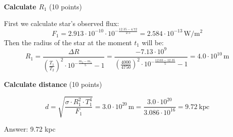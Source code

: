 \medskip
\noindent\textbf{Calculate $R_1$} \hfill(10 points)

First we calculate star's observed flux:
\[ F_1 = 2.913 \cdot 10^{-10} \cdot 10^{-\frac{12.35 - 4.72}{2.5}}
   = 2.584 \cdot 10^{-13}\,\mathrm{W/m^2} \]
Then the radius of the star at the moment $t_1$ will be:
\[ R_1 = \frac{\Delta R}
   {\left( \frac{T_1}{T_2} \right)^2 \cdot 10^{-\frac{m_2 - m_1}{5}} - 1}
   = \frac{-7.13 \cdot 10^9}
   {\left( \frac{4000}{4750} \right)^2
    \cdot 10^{-\frac{12.03 - 12.35}{5}} - 1}
   = 4.0 \cdot 10^{10}\,\mathrm{m} \]

\medskip
\noindent\textbf{Calculate distance} \hfill(10 points)

\[ d = \sqrt{ \frac{\sigma \cdot R_1^2 \cdot T_1^4}{F_1} }
   = 3.0 \cdot 10^{20}\,\mathrm{m}
   = \frac{3.0 \cdot 10^{20}}{3.086 \cdot 10^{16}} = 9.72\ \mathrm{kpc} \]

Answer: 9.72 kpc


